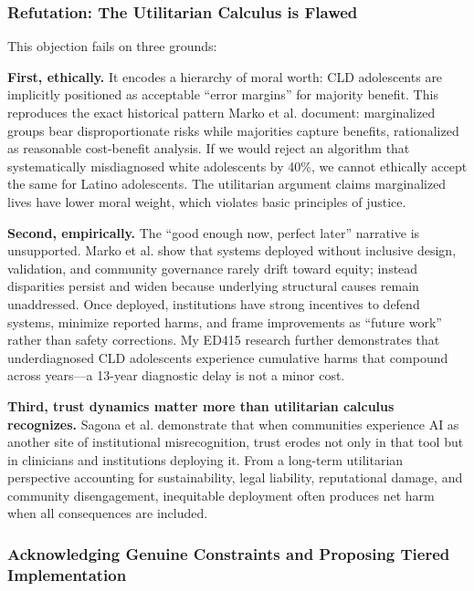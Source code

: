 \documentclass[12pt,a4paper]{article}
\begin{document}
\subsubsection{Refutation: The Utilitarian Calculus is Flawed}

This objection fails on three grounds:

\textbf{First, ethically.} It encodes a hierarchy of moral worth: CLD adolescents are implicitly positioned as acceptable ``error margins'' for majority benefit. This reproduces the exact historical pattern Marko et al. document: marginalized groups bear disproportionate risks while majorities capture benefits, rationalized as reasonable cost-benefit analysis.\cite{marko2025} If we would reject an algorithm that systematically misdiagnosed white adolescents by 40\%, we cannot ethically accept the same for Latino adolescents. The utilitarian argument claims marginalized lives have lower moral weight, which violates basic principles of justice.\cite{garcia_ed415}

\textbf{Second, empirically.} The ``good enough now, perfect later'' narrative is unsupported. Marko et al. show that systems deployed without inclusive design, validation, and community governance rarely drift toward equity; instead disparities persist and widen because underlying structural causes remain unaddressed.\cite{marko2025} Once deployed, institutions have strong incentives to defend systems, minimize reported harms, and frame improvements as ``future work'' rather than safety corrections. My ED415 research further demonstrates that underdiagnosed CLD adolescents experience cumulative harms that compound across years—a 13-year diagnostic delay is not a minor cost.\cite{garcia_ed415}

\textbf{Third, trust dynamics matter more than utilitarian calculus recognizes.} Sagona et al. demonstrate that when communities experience AI as another site of institutional misrecognition, trust erodes not only in that tool but in clinicians and institutions deploying it.\cite{sagona2025} From a long-term utilitarian perspective accounting for sustainability, legal liability, reputational damage, and community disengagement, inequitable deployment often produces net harm when all consequences are included.\cite{sagona2025}

\subsubsection{Acknowledging Genuine Constraints and Proposing Tiered Implementation}
\end{document}
